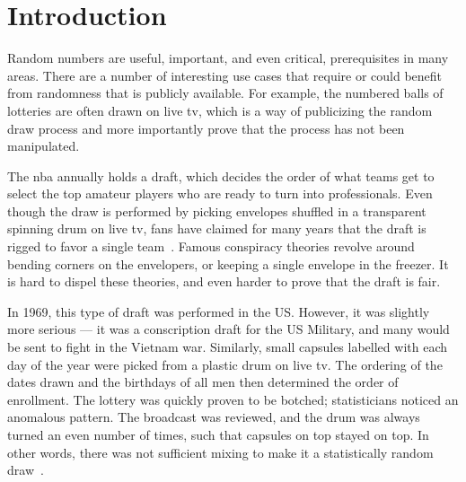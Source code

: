 \section{Introduction}\label{cha:introduction}

Random numbers are useful, important, and even critical, prerequisites in many areas.
There are a number of interesting use cases that require or could benefit from randomness that is publicly available. For example, the numbered balls of lotteries are often drawn on live tv, which is a way of publicizing the random draw process and more importantly prove that the process has not been manipulated.

The \gls{nba} annually holds a draft, which decides the order of what teams get to select the top amateur players who are ready to turn into professionals.
Even though the draw is performed by picking envelopes shuffled in a transparent spinning drum on live tv, fans have claimed for many years that the draft is rigged to favor a single team~\cite{princeton2016}. Famous conspiracy theories revolve around bending corners on the envelopers, or keeping a single envelope in the freezer.
It is hard to dispel these theories, and even harder to prove that the draft is fair.

In 1969, this type of draft was performed in the US\@. However, it was slightly more serious --- it was a conscription draft for the US Military, and many would be sent to fight in the Vietnam war.
Similarly, small capsules labelled with each day of the year were picked from a plastic drum on live tv.
The ordering of the dates drawn and the birthdays of all men then determined the order of enrollment.
The lottery was quickly proven to be botched; statisticians noticed an anomalous pattern.
The broadcast was reviewed, and the drum was always turned an even number of times, such that capsules on top stayed on top.
In other words, there was not sufficient mixing to make it a statistically random draw~\cite{princeton2016}.

